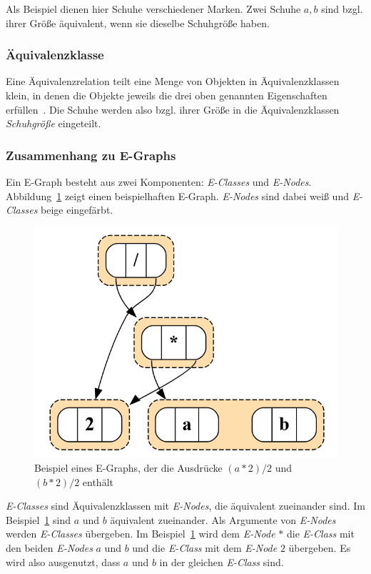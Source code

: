 Als Beispiel dienen hier Schuhe verschiedener Marken. Zwei Schuhe $a, b$ sind bzgl. ihrer Größe äquivalent, wenn sie dieselbe Schuhgröße haben. 

\subsubsection{Äquivalenzklasse}

Eine Äquivalenzrelation teilt eine Menge von Objekten in Äquivalenzklassen klein, in denen die Objekte jeweils die drei oben genannten Eigenschaften erfüllen~\cite{Ehrig2001}.
Die Schuhe werden also bzgl. ihrer Größe in die Äquivalenzklassen \textit{Schuhgröße} eingeteilt.

\subsubsection{Zusammenhang zu E-Graphs}

Ein E-Graph besteht aus zwei Komponenten: \textit{E-Classes} und \textit{E-Nodes}. Abbildung~\ref{fig:egraphexp} zeigt einen beispielhaften E-Graph.
\textit{E-Nodes} sind dabei weiß und \textit{E-Classes} beige eingefärbt.

\begin{figure}[H]
  \centering
  \includegraphics[scale=0.5]{../fig/egraph_exp.png}
  \caption{Beispiel eines E-Graphs, der die Ausdrücke $(a * 2) / 2$ und $(b * 2) / 2$ enthält}
  \label{fig:egraphexp}
\end{figure}

\textit{E-Classes} sind Äquivalenzklassen mit \textit{E-Nodes}, die äquivalent zueinander sind. Im Beispiel~\ref{fig:egraphexp} sind $a$ und $b$ äquivalent zueinander.
Als Argumente von \textit{E-Nodes} werden \textit{E-Classes} übergeben. Im Beispiel~\ref{fig:egraphexp} wird dem \textit{E-Node} $*$ die \textit{E-Class} mit den beiden 
\textit{E-Nodes} $a$ und $b$ und die \textit{E-Class} mit dem \textit{E-Node} $2$ übergeben. Es wird also ausgenutzt, dass $a$ und $b$ in der gleichen \textit{E-Class}
sind. 

